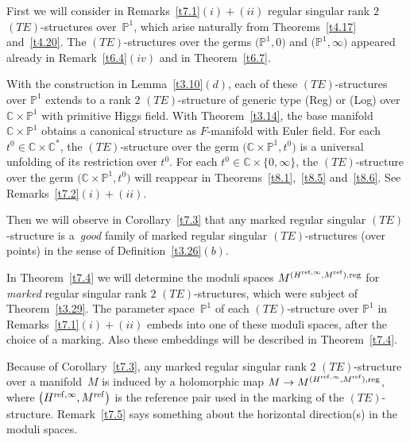 \documentclass[10pt,a4paper]{amsart}
\numberwithin{equation}{section}
\numberwithin{figure}{section}
\newcommand{\C}{{\mathbb C}}
\renewcommand{\P}{{\mathbb P}}
\begin{document}
First we will consider in Remarks~\ref{t7.1}$(i){+}(ii)$
regular singular rank $2$ $(TE)$-structures over~$\P^1$,
which arise naturally
from Theorems~\ref{t4.17} and~\ref{t4.20}.
The $(TE)$-structures over the germs
$\big(\P^1,0\big)$ and $\big(\P^1,\infty\big)$ appeared already
in Remark~\ref{t6.4}$(iv)$ and in Theorem~\ref{t6.7}.

With the construction in Lemma~\ref{t3.10}$(d)$,
each of these $(TE)$-structures over $\P^1$
extends to a rank $2$ $(TE)$-structure
of generic type (Reg) or (Log)
over $\C\times\P^1$ with primitive Higgs field.
With Theorem~\ref{t3.14}, the base manifold
$\C\times\P^1$ obtains a canonical structure
as $F$-manifold with Euler field.
For each $t^0\in\C\times\C^*$, the $(TE)$-structure
over the germ $\big(\C\times\P^1,t^0\big)$ is a universal
unfolding of its restriction over $t^0$.
For each $t^0\in\C\times\{0,\infty\}$, the
$(TE)$-structure over the germ
$\big(\C\times \P^1,t^0\big)$ will reappear in Theorems~\ref{t8.1},~\ref{t8.5} and~\ref{t8.6}.
See Remarks~\ref{t7.2}$(i){+}(ii)$.


Then we will observe in Corollary~\ref{t7.3} that
any marked regular singular $(TE)$-structure
is a~{\it good} family of marked regular singular
$(TE)$-structures (over points) in the sense of Definition~\ref{t3.26}$(b)$.

In Theorem~\ref{t7.4} we will determine the moduli spaces
$M^{(H^{{\rm ref},\infty},M^{\rm ref}),{\rm reg}}$
for {\it marked} regular singular
rank $2$ $(TE)$-structures, which were subject of
Theorem~\ref{t3.29}. The parameter space~$\P^1$ of each
$(TE)$-structure over $\P^1$ in Remarks~\ref{t7.1}$(i){+}(ii)$
embeds into one of these moduli spaces, after the choice
of a marking. Also these embeddings will be described
in Theorem~\ref{t7.4}.

Because of Corollary~\ref{t7.3}, any marked
regular singular rank $2$ $(TE)$-structure
over a mani\-fold~$M$ is induced by a holomorphic map
$M\to M^{(H^{{\rm ref},\infty},M^{\rm ref}),{\rm reg}}$,
where $\big(H^{{\rm ref},\infty},M^{\rm ref}\big)$ is the reference
pair used in the marking of the $(TE)$-structure.
Remark~\ref{t7.5} says something about the
horizontal direction(s) in the moduli spaces.
\end{document}
